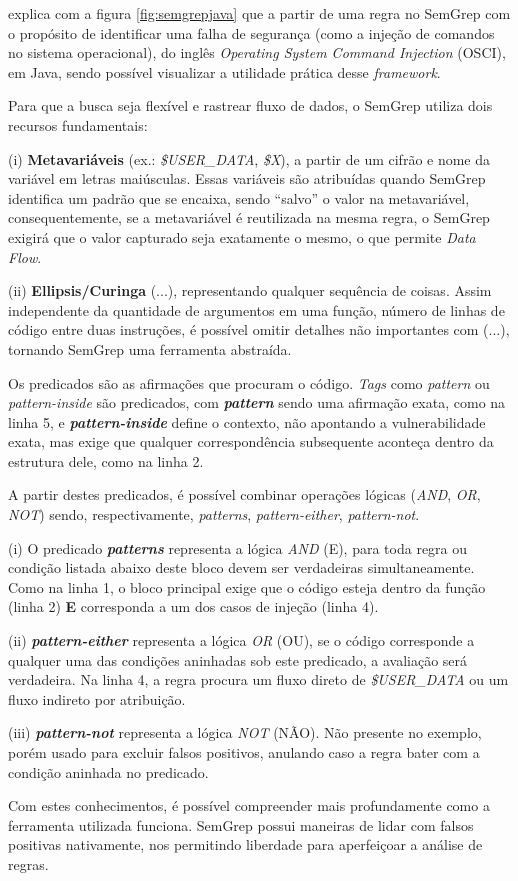 \documentclass[
    12pt,                %
    openright,           %
    oneside,             %
    a4paper,             %
    english,             %
    brazil               %
]{abntex2}
\begin{document}
\par
{} explica com a figura \ref{fig:semgrepjava} que a partir de uma regra no SemGrep com o propósito de identificar uma falha de segurança (como a injeção de comandos no sistema operacional), do inglês \textit{Operating System Command Injection} (OSCI), em Java, sendo possível visualizar a utilidade prática desse \textit{framework}.
\par
Para que a busca seja flexível e rastrear fluxo de dados, o SemGrep utiliza dois recursos fundamentais: 
\par
(i) \textbf{Metavariáveis} (ex.: \textit{\$USER\_DATA}, \textit{\$X}), a partir de um cifrão e nome da variável em letras maiúsculas.
Essas variáveis são atribuídas quando SemGrep identifica um padrão que se encaixa, sendo ``salvo'' o valor na metavariável, consequentemente, se a metavariável é reutilizada na mesma regra, o SemGrep exigirá que o valor capturado seja exatamente o mesmo, o que permite \textit{Data Flow}.
\par
(ii) \textbf{Ellipsis/Curinga} (...), representando qualquer sequência de coisas.
Assim independente da quantidade de argumentos em uma função, número de linhas de código entre duas instruções, é possível omitir detalhes não importantes com (...), tornando SemGrep uma ferramenta abstraída.
\par
Os predicados são as afirmações que procuram o código.
\textit{Tags} como \textit{pattern} ou \textit{pattern-inside} são predicados, com \textit{\textbf{pattern}} sendo uma afirmação exata, como na linha 5, e \textit{\textbf{pattern-inside}} define o contexto, não apontando a vulnerabilidade exata, mas exige que qualquer correspondência subsequente aconteça dentro da estrutura dele, como na linha 2.
\par
A partir destes predicados, é possível combinar operações lógicas (\textit{AND}, \textit{OR}, \textit{NOT}) sendo, respectivamente, \textit{patterns}, \textit{pattern-either}, \textit{pattern-not}.
\par
(i) O predicado \textit{\textbf{patterns}} representa a lógica \textit{AND} (E), para toda regra ou condição listada abaixo deste bloco devem ser verdadeiras simultaneamente.
Como na linha 1, o bloco principal exige que o código esteja dentro da função (linha 2) \textbf{E} corresponda a um dos casos de injeção (linha 4).
\par
(ii) \textbf{\textit{pattern-either}} representa a lógica \textit{OR} (OU), se o código corresponde a qualquer uma das condições aninhadas sob este predicado, a avaliação será verdadeira. Na linha 4, a regra procura um fluxo direto de \textit{\$USER\_DATA} ou um fluxo indireto por atribuição.
\par
(iii) \textbf{\textit{pattern-not}} representa a lógica \textit{NOT} (NÃO).
Não presente no exemplo, porém usado para excluir falsos positivos, anulando caso a regra bater com a condição aninhada no predicado.
\par
Com estes conhecimentos, é possível compreender mais profundamente como a ferramenta utilizada funciona. SemGrep possui maneiras de lidar com falsos positivas nativamente, nos permitindo liberdade para aperfeiçoar a análise de regras.
\end{document}
